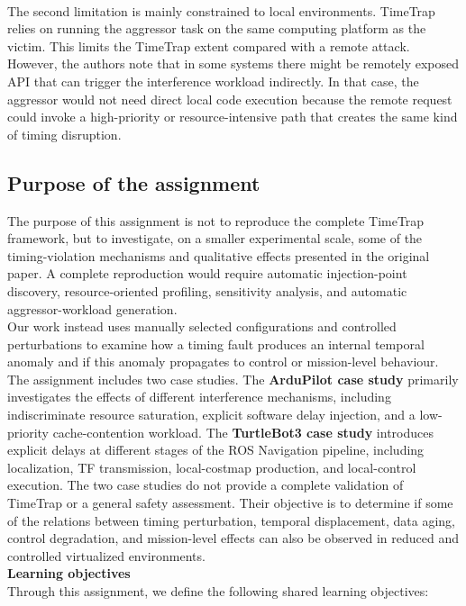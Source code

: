 \\
The second limitation is mainly constrained to local environments. TimeTrap relies on running the aggressor task on the same computing platform as the victim. This limits the TimeTrap extent compared with a remote attack. However, the authors note that in some systems there might be remotely exposed API that can trigger the interference workload indirectly. In that case, the aggressor would not need direct local code execution because the remote request could invoke a high-priority or resource-intensive path that creates the same kind of timing disruption.

\subsection{Purpose of the assignment}
The purpose of this assignment is not to reproduce the complete TimeTrap framework, but to investigate, on a smaller experimental scale, some of the timing-violation mechanisms and qualitative effects presented in the original paper. A complete reproduction would require automatic injection-point discovery, resource-oriented profiling, sensitivity analysis, and automatic aggressor-workload generation.
\\
Our work instead uses manually selected configurations and controlled perturbations to examine how a timing fault produces an internal temporal anomaly and if this anomaly propagates to control or mission-level behaviour.
The assignment includes two case studies. The \textbf{ArduPilot case study} primarily investigates the effects of different interference mechanisms, including indiscriminate resource saturation, explicit software delay injection, and a low-priority cache-contention workload.
The \textbf{TurtleBot3 case study} introduces explicit delays at different stages of the ROS Navigation pipeline, including localization, TF transmission, local-costmap production, and local-control execution. 
The two case studies do not provide a complete validation of TimeTrap or a general safety assessment. Their objective is to determine if some of the relations between timing perturbation, temporal displacement, data aging, control degradation, and mission-level effects can also be observed in reduced and controlled virtualized environments.
\\
\textbf{Learning objectives}\\ %
Through this assignment, we define the following shared learning objectives:
